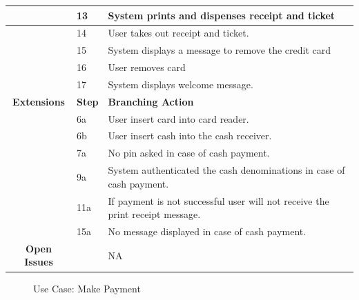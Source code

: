 \documentclass[a4paper,12pt]{report}
\begin{document}
\begin{tabular}{ | c | p{2cm} | p{7cm} |}
	\hline
	&  13  & System prints and dispenses receipt and ticket \\
	\hline
	&  14  & User takes out receipt and ticket. \\
	\hline
	&  15  & System displays a message to remove the credit card \\
	\hline
	&  16  & User removes card \\
	\hline
	&  17  & System displays welcome message. \\
	\hline
	
	\textbf{Extensions} & \textbf{Step} & \textbf{Branching Action} \\
	\hline
	&  6a  & User insert card into card reader. \\
	\hline
	&  6b  & User insert cash into the cash receiver. \\
	\hline
	&  7a  & No pin asked in case of cash payment. \\
	\hline
	&  9a  & System authenticated the cash denominations in case of cash payment. \\
	\hline
	&  11a  & If payment is not successful user will not receive the print receipt message. \\
	\hline
	&  15a  & No message displayed in case of cash payment. \\
	\hline
	\textbf{Open Issues} &    & NA \\
	\hline
	
\end{tabular}


\begin{figure}[!htb]
	\caption{\label{fig:uc_make_payment : }Use Case: Make Payment}	
\end{figure}
\end{document}
